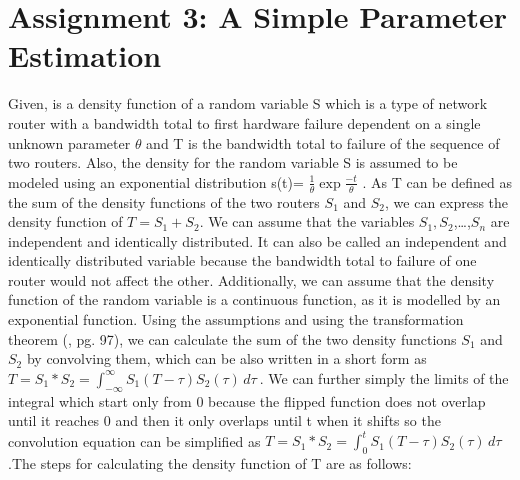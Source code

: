 \chapter{Assignment 3: A Simple Parameter Estimation}

Given, is a density function of a random variable S which is a type of network router with a bandwidth total to first hardware failure dependent on a single unknown parameter $\theta$ and T is the bandwidth total to failure of the sequence of two routers. Also, the density for the random variable S is assumed to be modeled using an exponential distribution s(t)=  $\frac{1}{\theta} \exp{\frac{-t}{\theta}}$ . As T can be defined as the sum of the density functions of the two routers $S_1$  and $S_2$, we can express the density function of  $T= S_1+S_2$.\newline \newline 
We can assume that the variables $S_1,S_2$,…,$S_n$ are independent and identically distributed. It can also be called an independent and identically distributed variable because the bandwidth total to failure of one router would not affect the other. Additionally, we can assume that the density function of the random variable is a continuous function, as it is modelled by an exponential function.\newline \newline
Using the assumptions and using the transformation theorem (\cite{Iubh:2021}, pg. 97), we can calculate the sum of the two density functions $S_1$  and $S_2$ by convolving them, which can be also written in a short form as $T=S_1*S_2= \int_{-\infty}^{\infty} S_1(T-\tau) S_2(\tau) \,d\tau\ $.\newline\newline
We can further simply the limits of the integral which start only from 0 because the flipped function does not overlap until it reaches 0 and then it only overlaps until t when it shifts so the convolution equation can be simplified as $T=S_1*S_2= \int_{0}^{t} S_1(T-\tau) S_2(\tau)\,d\tau\ $.The steps for calculating the density function of T are as follows:

